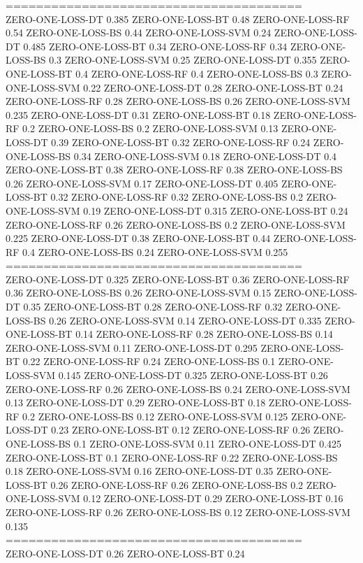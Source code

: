 \documentclass[12pt]{article}
\begin{document}
\noindent=======================================\\
ZERO-ONE-LOSS-DT 0.385
ZERO-ONE-LOSS-BT 0.48
ZERO-ONE-LOSS-RF 0.54
ZERO-ONE-LOSS-BS 0.44
ZERO-ONE-LOSS-SVM 0.24
ZERO-ONE-LOSS-DT 0.485
ZERO-ONE-LOSS-BT 0.34
ZERO-ONE-LOSS-RF 0.34
ZERO-ONE-LOSS-BS 0.3
ZERO-ONE-LOSS-SVM 0.25
ZERO-ONE-LOSS-DT 0.355
ZERO-ONE-LOSS-BT 0.4
ZERO-ONE-LOSS-RF 0.4
ZERO-ONE-LOSS-BS 0.3
ZERO-ONE-LOSS-SVM 0.22
ZERO-ONE-LOSS-DT 0.28
ZERO-ONE-LOSS-BT 0.24
ZERO-ONE-LOSS-RF 0.28
ZERO-ONE-LOSS-BS 0.26
ZERO-ONE-LOSS-SVM 0.235
ZERO-ONE-LOSS-DT 0.31
ZERO-ONE-LOSS-BT 0.18
ZERO-ONE-LOSS-RF 0.2
ZERO-ONE-LOSS-BS 0.2
ZERO-ONE-LOSS-SVM 0.13
ZERO-ONE-LOSS-DT 0.39
ZERO-ONE-LOSS-BT 0.32
ZERO-ONE-LOSS-RF 0.24
ZERO-ONE-LOSS-BS 0.34
ZERO-ONE-LOSS-SVM 0.18
ZERO-ONE-LOSS-DT 0.4
ZERO-ONE-LOSS-BT 0.38
ZERO-ONE-LOSS-RF 0.38
ZERO-ONE-LOSS-BS 0.26
ZERO-ONE-LOSS-SVM 0.17
ZERO-ONE-LOSS-DT 0.405
ZERO-ONE-LOSS-BT 0.32
ZERO-ONE-LOSS-RF 0.32
ZERO-ONE-LOSS-BS 0.2
ZERO-ONE-LOSS-SVM 0.19
ZERO-ONE-LOSS-DT 0.315
ZERO-ONE-LOSS-BT 0.24
ZERO-ONE-LOSS-RF 0.26
ZERO-ONE-LOSS-BS 0.2
ZERO-ONE-LOSS-SVM 0.225
ZERO-ONE-LOSS-DT 0.38
ZERO-ONE-LOSS-BT 0.44
ZERO-ONE-LOSS-RF 0.4
ZERO-ONE-LOSS-BS 0.24
ZERO-ONE-LOSS-SVM 0.255\\
=======================================\\
ZERO-ONE-LOSS-DT 0.325
ZERO-ONE-LOSS-BT 0.36
ZERO-ONE-LOSS-RF 0.36
ZERO-ONE-LOSS-BS 0.26
ZERO-ONE-LOSS-SVM 0.15
ZERO-ONE-LOSS-DT 0.35
ZERO-ONE-LOSS-BT 0.28
ZERO-ONE-LOSS-RF 0.32
ZERO-ONE-LOSS-BS 0.26
ZERO-ONE-LOSS-SVM 0.14
ZERO-ONE-LOSS-DT 0.335
ZERO-ONE-LOSS-BT 0.14
ZERO-ONE-LOSS-RF 0.28
ZERO-ONE-LOSS-BS 0.14
ZERO-ONE-LOSS-SVM 0.11
ZERO-ONE-LOSS-DT 0.295
ZERO-ONE-LOSS-BT 0.22
ZERO-ONE-LOSS-RF 0.24
ZERO-ONE-LOSS-BS 0.1
ZERO-ONE-LOSS-SVM 0.145
ZERO-ONE-LOSS-DT 0.325
ZERO-ONE-LOSS-BT 0.26
ZERO-ONE-LOSS-RF 0.26
ZERO-ONE-LOSS-BS 0.24
ZERO-ONE-LOSS-SVM 0.13
ZERO-ONE-LOSS-DT 0.29
ZERO-ONE-LOSS-BT 0.18
ZERO-ONE-LOSS-RF 0.2
ZERO-ONE-LOSS-BS 0.12
ZERO-ONE-LOSS-SVM 0.125
ZERO-ONE-LOSS-DT 0.23
ZERO-ONE-LOSS-BT 0.12
ZERO-ONE-LOSS-RF 0.26
ZERO-ONE-LOSS-BS 0.1
ZERO-ONE-LOSS-SVM 0.11
ZERO-ONE-LOSS-DT 0.425
ZERO-ONE-LOSS-BT 0.1
ZERO-ONE-LOSS-RF 0.22
ZERO-ONE-LOSS-BS 0.18
ZERO-ONE-LOSS-SVM 0.16
ZERO-ONE-LOSS-DT 0.35
ZERO-ONE-LOSS-BT 0.26
ZERO-ONE-LOSS-RF 0.26
ZERO-ONE-LOSS-BS 0.2
ZERO-ONE-LOSS-SVM 0.12
ZERO-ONE-LOSS-DT 0.29
ZERO-ONE-LOSS-BT 0.16
ZERO-ONE-LOSS-RF 0.26
ZERO-ONE-LOSS-BS 0.12
ZERO-ONE-LOSS-SVM 0.135\\
=======================================\\
ZERO-ONE-LOSS-DT 0.26
ZERO-ONE-LOSS-BT 0.24
\end{document}
